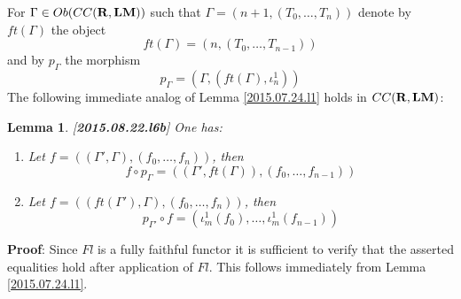 \documentclass[11pt]{article}
\newenvironment{proof}{{\bf Proof}:}{\vskip 5mm }
\newtheorem{lemma}[proposition]{Lemma}
\newcommand{\llabel}[1]{\label{#1}[{\bf #1}]}
\newcommand{\rr}{{\bf R}}
\newcommand{\lm}{{\bf LM}}
\begin{document}
For $\Gamma\in Ob(CC(\rr,\lm))$ such that $\Gamma=(n+1,(T_0,\dots,T_n))$ denote by $ft(\Gamma)$ the object 
%
$$ft(\Gamma)=(n,(T_0,\dots,T_{n-1}))$$
%
and by $p_{\Gamma}$ the morphism 
%
$$p_{\Gamma}=(\Gamma, (ft(\Gamma), \iota_n^1))$$
%
The following immediate analog of Lemma \ref{2015.07.24.l1} holds in $CC(\rr,\lm)$:
%
\begin{lemma}
\llabel{2015.08.22.l6b}
One has:
%
\begin{enumerate}
\item Let $f=((\Gamma',\Gamma),(f_0,\dots,f_n))$, then 
%
$$f\circ p_{\Gamma}=((\Gamma',ft(\Gamma)),(f_0,\dots,f_{n-1}))$$
%
\item Let $f=((ft(\Gamma'),\Gamma),(f_0,\dots,f_n))$, then 
%
$$p_{\Gamma'}\circ f=(\iota_m^1(f_0),\dots,\iota_m^1(f_{n-1}))$$
%
\end{enumerate}
\end{lemma}
%
\begin{proof}
Since $Fl$ is a fully faithful functor it is sufficient to verify that the asserted equalities hold after application of $Fl$. This follows immediately from Lemma \ref{2015.07.24.l1}.
\end{proof}
%
\end{document}

